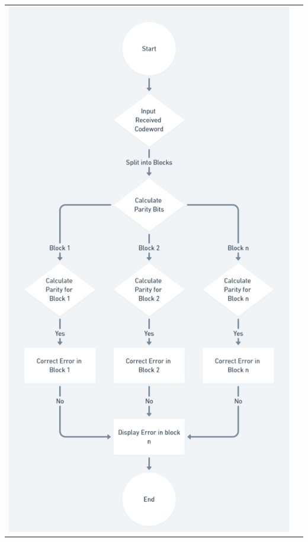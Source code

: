 \documentclass{article}
\begin{document}
\begin{tabular}{cc}
        \includegraphics[scale=0.6]{decoding.png}
  



\end{tabular}

   
   
\end{document}
